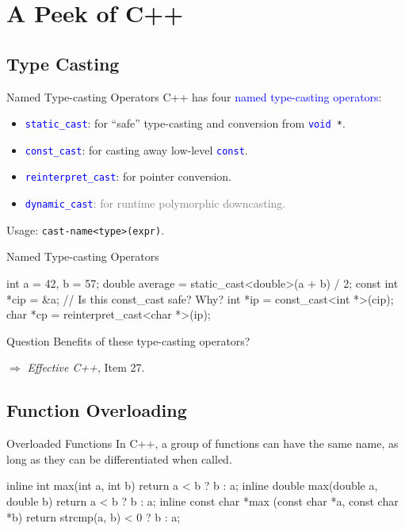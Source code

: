 \documentclass{beamer}
\newcommand{\blue}[1]{\textcolor{blue}{#1}}
\newcommand{\gray}[1]{\textcolor{gray}{#1}}
\newcommand{\ttt}[1]{\texttt{#1}}
\newcommand{\bluett}[1]{\blue{\ttt{#1}}}
\newenvironment{question}{\begin{alertblock}{Question}}{\end{alertblock}}
\theoremstyle{definition}
\begin{document}
\section{A Peek of C++}

\subsection{Type Casting}

\begin{frame}{Named Type-casting Operators}
    C++ has four \blue{named type-casting operators}:
    \begin{itemize}
        \item \bluett{static\_cast}: for ``safe'' type-casting and conversion from \bluett{void }\ttt{*}.
        \item \bluett{const\_cast}: for casting away low-level \bluett{const}.
        \item \bluett{reinterpret\_cast}: for pointer conversion.
        \item \gray{\bluett{dynamic\_cast}: for runtime polymorphic downcasting.}
    \end{itemize}
    \pause
    Usage: \ttt{cast-name<type>(expr)}.
\end{frame}

\begin{frame}[fragile]{Named Type-casting Operators}
    \begin{cpp}
int a = 42, b = 57;
double average = static_cast<double>(a + b) / 2;
const int *cip = &a;
// Is this const_cast safe? Why?
int *ip = const_cast<int *>(cip);
char *cp = reinterpret_cast<char *>(ip);
    \end{cpp}
    \pause
    \begin{question}
        Benefits of these type-casting operators?
    \end{question}
    \pause
    \(\Rightarrow\) \textit{Effective C++}, Item 27.
\end{frame}

\subsection{Function Overloading}

\begin{frame}[fragile]{Overloaded Functions}
    In C++, a group of functions can have the same name, as long as they can be differentiated when called.
    \begin{cpp}
inline int max(int a, int b) {
  return a < b ? b : a;
}
inline double max(double a, double b) {
  return a < b ? b : a;
}
inline const char *max
    (const char *a, const char *b) {
  return strcmp(a, b) < 0 ? b : a;
}
    \end{cpp}
\end{frame}
\end{document}
